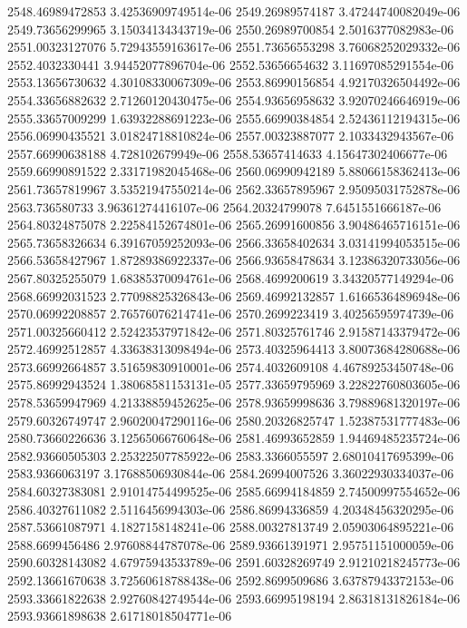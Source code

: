 {2548.46989472853 3.42536909749514e-06
2549.26989574187 3.47244740082049e-06
2549.73656299965 3.15034134343719e-06
2550.26989700854 2.5016377082983e-06
2551.00323127076 5.72943559163617e-06
2551.73656553298 3.76068252029332e-06
2552.4032330441 3.94452077896704e-06
2552.53656654632 3.11697085291554e-06
2553.13656730632 4.30108330067309e-06
2553.86990156854 4.92170326504492e-06
2554.33656882632 2.71260120430475e-06
2554.93656958632 3.92070246646919e-06
2555.33657009299 1.63932288691223e-06
2555.66990384854 2.52436112194315e-06
2556.06990435521 3.01824718810824e-06
2557.00323887077 2.1033432943567e-06
2557.66990638188 4.728102679949e-06
2558.53657414633 4.15647302406677e-06
2559.66990891522 2.33171982045468e-06
2560.06990942189 5.88066158362413e-06
2561.73657819967 3.53521947550214e-06
2562.33657895967 2.95095031752878e-06
2563.736580733 3.96361274416107e-06
2564.20324799078 7.6451551666187e-06
2564.80324875078 2.22584152674801e-06
2565.26991600856 3.90486465716151e-06
2565.73658326634 6.39167059252093e-06
2566.33658402634 3.03141994053515e-06
2566.53658427967 1.87289386922337e-06
2566.93658478634 3.12386320733056e-06
2567.80325255079 1.68385370094761e-06
2568.4699200619 3.34320577149294e-06
2568.66992031523 2.77098825326843e-06
2569.46992132857 1.61665364896948e-06
2570.06992208857 2.76576076214741e-06
2570.2699223419 3.40256595974739e-06
2571.00325660412 2.52423537971842e-06
2571.80325761746 2.91587143379472e-06
2572.46992512857 4.33638313098494e-06
2573.40325964413 3.80073684280688e-06
2573.66992664857 3.51659830910001e-06
2574.4032609108 4.46789253450748e-06
2575.86992943524 1.38068581153131e-05
2577.33659795969 3.22822760803605e-06
2578.53659947969 4.21338859452625e-06
2578.93659998636 3.79889681320197e-06
2579.60326749747 2.96020047290116e-06
2580.20326825747 1.52387531777483e-06
2580.73660226636 3.12565066760648e-06
2581.46993652859 1.94469485235724e-06
2582.93660505303 2.25322507785922e-06
2583.3366055597 2.68010417695399e-06
2583.9366063197 3.17688506930844e-06
2584.26994007526 3.36022930334037e-06
2584.60327383081 2.91014754499525e-06
2585.66994184859 2.74500997554652e-06
2586.40327611082 2.5116456994303e-06
2586.86994336859 4.20348456320295e-06
2587.53661087971 4.1827158148241e-06
2588.00327813749 2.05903064895221e-06
2588.6699456486 2.97608844787078e-06
2589.93661391971 2.95751151000059e-06
2590.60328143082 4.67975943533789e-06
2591.60328269749 2.91210218245773e-06
2592.13661670638 3.72560618788438e-06
2592.8699509686 3.63787943372153e-06
2593.33661822638 2.92760842749544e-06
2593.66995198194 2.86318131826184e-06
2593.93661898638 2.61718018504771e-06
}
